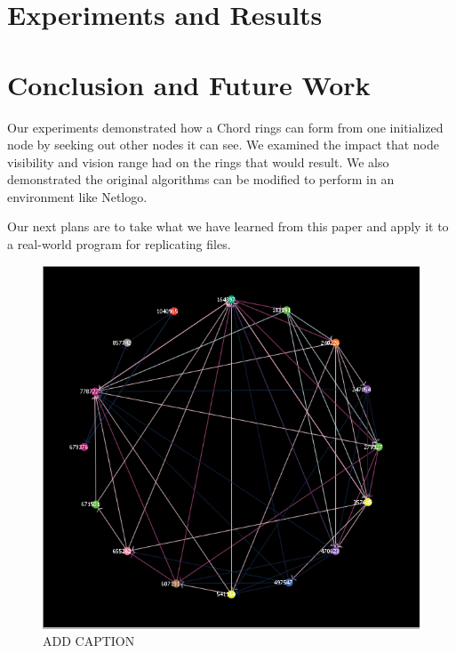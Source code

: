 \documentclass[12pt]{article} %
\begin{document}
\section{Experiments and Results}


\section{Conclusion and Future Work}
Our experiments demonstrated how a Chord rings can form from one initialized node by seeking out other nodes it can see.  We examined the impact that  node visibility and vision range had on the rings that would result. We also demonstrated the original algorithms can be modified to perform in an environment like Netlogo.

Our next plans are to take what we have learned from this paper and apply it to a real-world program for replicating files.



\begin{figure}
\includegraphics[width=\linewidth]{example_problem}
\caption{ADD CAPTION}
\label{problem}
\end{figure}
\end{document}
